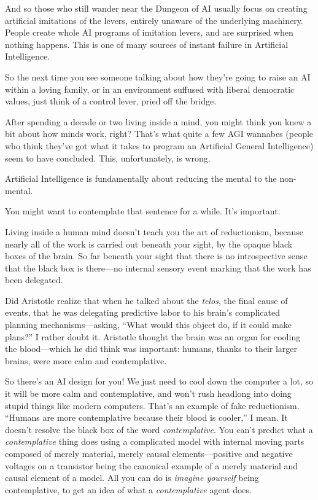  And so those who still wander near the Dungeon of AI usually focus
on creating artificial imitations of the levers, entirely unaware of
the underlying machinery. People create whole AI programs of imitation
levers, and are surprised when nothing happens. This is one of many
sources of instant failure in Artificial Intelligence.


 So the next time you see someone talking about how
they're going to raise an AI within a loving family, or
in an environment suffused with liberal democratic values, just think
of a control lever, pried off the bridge.

\myendsectiontext


\bigskip



 After spending a decade or two living inside a mind, you might
think you knew a bit about how minds work, right?
That's what quite a few AGI wannabes (people who think
they've got what it takes to program an Artificial
General Intelligence) seem to have concluded. This, unfortunately, is
wrong. 


 Artificial Intelligence is fundamentally about reducing the mental
to the non-mental.


 You might want to contemplate that sentence for a while.
It's important.


 Living inside a human mind doesn't teach you the
art of reductionism, because nearly all of the work is carried out
beneath your sight, by the opaque black boxes of the brain. So far
beneath your sight that there is no introspective sense that the black
box is there---no internal sensory event marking that the work has been
delegated.


 Did Aristotle realize that when he talked about the
\textit{telos}, the final cause of events, that he was delegating
predictive labor to his brain's complicated planning
mechanisms---asking, ``What would this object do, if
it could make plans?'' I rather doubt it. Aristotle
thought the brain was an organ for cooling the blood---which he did
think was important: humans, thanks to their larger brains, were more
calm and contemplative.


 So there's an AI design for you! We just need to
cool down the computer a lot, so it will be more calm and
contemplative, and won't rush headlong into doing
stupid things like modern computers. That's an example
of fake reductionism. ``Humans are more contemplative
because their blood is cooler,'' I mean. It
doesn't resolve the black box of the word
\textit{contemplative}. You can't predict what a
\textit{contemplative} thing does using a complicated model with
internal moving parts composed of merely material, merely causal
elements---positive and negative voltages on a transistor being the
canonical example of a merely material and causal element of a model.
All you can do is \textit{imagine yourself} being contemplative, to get
an idea of what a \textit{contemplative} agent does.


